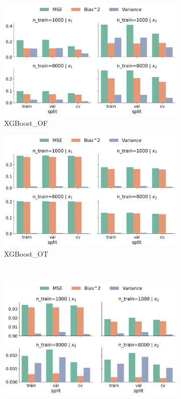 \documentclass[runningheads]{llncs}
\begin{document}
\begin{figure}[htbp]
\begin{subfigure}[b]{0.49\textwidth}
        \includegraphics[width=\textwidth]{img/SNC/feature_effect_errors_pdp_XGBoost_OF.png}
        \caption{XGBoost\_OF}
        \label{fig:pdp-results-snc-xgboost-of}  %
    \end{subfigure}
    \hfill
    \begin{subfigure}[b]{0.49\textwidth}
        \includegraphics[width=\textwidth]{img/SNC/feature_effect_errors_pdp_XGBoost_OT.png}
        \caption{XGBoost\_OT}
        \label{fig:pdp-results-snc-xgboost-ot}  %
    \end{subfigure}
    \\[10pt]
    \vfill
    \begin{subfigure}[b]{0.49\textwidth}
        \includegraphics[width=\textwidth]{img/SNC/feature_effect_errors_pdp_SVM_OT.png}

\end{subfigure}
\end{figure}
\end{document}
